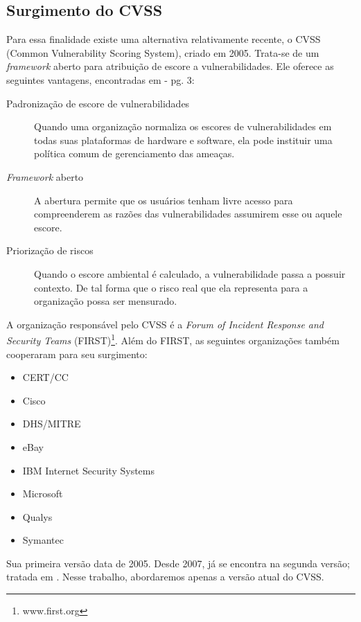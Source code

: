 		\subsection{Surgimento do CVSS}
			Para essa finalidade existe uma alternativa relativamente recente, o CVSS
			(Common Vulnerability Scoring System), criado em 2005. 
			Trata-se de um \textsl{framework} aberto para atribuição de escore a vulnerabilidades.
			Ele oferece as seguintes vantagens, encontradas em \cite{Mell2007} - pg. 3:
			\begin{description}
				\item[Padronização de escore de vulnerabilidades]{Quando uma organização normaliza
				os escores de vulnerabilidades em todas suas plataformas de hardware e software,
				ela pode instituir uma política comum de gerenciamento das ameaças.}
				\item[\textsl{Framework} aberto]{A abertura permite que os usuários tenham
				livre acesso para compreenderem as razões das vulnerabilidades assumirem
				esse ou aquele escore.}
				\item[Priorização de riscos]{Quando o escore ambiental é calculado, a vulnerabilidade
				passa a possuir contexto. De tal forma que o risco real que ela representa
				para a organização possa ser mensurado.}
			\end{description}

			
			A organização responsável pelo CVSS é a 
			\textsl{Forum of Incident Response and Security Teams} (FIRST)\footnote{www.first.org}.
			Além do FIRST, as seguintes organizações também cooperaram para seu surgimento:
			\begin{itemize}	
				\item{CERT/CC}
				\item{Cisco}
				\item{DHS/MITRE}
				\item{eBay}
				\item{IBM Internet Security Systems}
				\item{Microsoft}
				\item{Qualys}
				\item{Symantec}
			\end{itemize}	
			Sua primeira versão data de 2005. Desde 2007, já se encontra na segunda versão;
			tratada em \cite{Mell2007}. Nesse trabalho, abordaremos	apenas a versão atual do CVSS.

